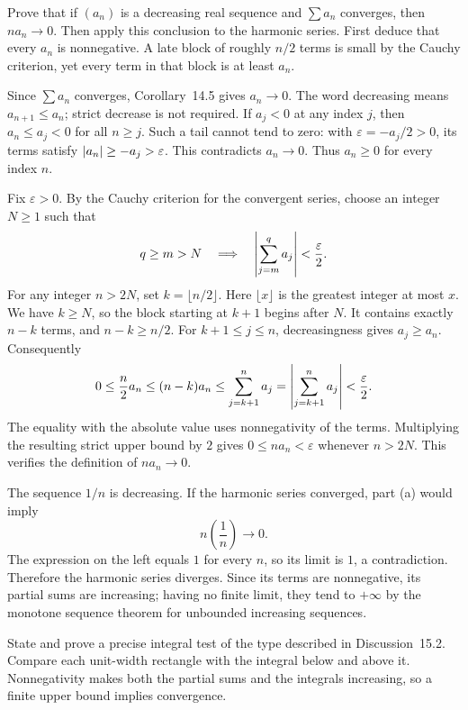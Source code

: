 \goal Prove that if $(a_n)$ is a decreasing real sequence and
$\sum a_n$ converges, then $na_n\to0$. Then apply this conclusion
to the harmonic series.
\idea First deduce that every $a_n$ is nonnegative. A late block
of roughly $n/2$ terms is small by the Cauchy criterion, yet every
term in that block is at least $a_n$.

Since $\sum a_n$ converges, Corollary~14.5 gives $a_n\to0$.
The word decreasing means $a_{n+1}\le a_n$; strict decrease is
not required. If $a_j<0$ at any index $j$, then $a_n\le a_j<0$
for all $n\ge j$. Such a tail cannot tend to zero: with
$\varepsilon=-a_j/2>0$, its terms satisfy
$\left|a_n\right|\ge-a_j>\varepsilon$. This contradicts $a_n\to0$.
Thus $a_n\ge0$ for every index $n$.

Fix $\varepsilon>0$. By the Cauchy criterion for the convergent
series, choose an integer $N\ge1$ such that
\[
 q\ge m>N\quad\Longrightarrow\quad
 \left|\sum_{j=m}^{q}a_j\right|<\frac{\varepsilon}{2}.
\]
For any integer $n>2N$, set $k=\lfloor n/2\rfloor$.
Here $\lfloor x\rfloor$ is the greatest integer at most $x$.
We have $k\ge N$, so the block starting at $k+1$ begins after $N$.
It contains exactly $n-k$ terms, and $n-k\ge n/2$.
For $k+1\le j\le n$, decreasingness gives $a_j\ge a_n$.
Consequently
\[
 0\le\frac n2 a_n
 \le(n-k)a_n
 \le\sum_{j=k+1}^{n}a_j
 =\left|\sum_{j=k+1}^{n}a_j\right|
 <\frac{\varepsilon}{2}.
\]
The equality with the absolute value uses nonnegativity of the
terms. Multiplying the resulting strict upper bound by $2$ gives
$0\le na_n<\varepsilon$ whenever $n>2N$.
This verifies the definition of $na_n\to0$.

The sequence $1/n$ is decreasing. If the harmonic series converged,
part (a) would imply
\[
 n\left(\frac1n\right)\longrightarrow0.
\]
The expression on the left equals $1$ for every $n$, so its limit
is $1$, a contradiction. Therefore the harmonic series diverges.
Since its terms are nonnegative, its partial sums are increasing;
having no finite limit, they tend to $+\infty$ by the monotone
sequence theorem for unbounded increasing sequences.

\goal State and prove a precise integral test of the type described
in Discussion~15.2.
\idea Compare each unit-width rectangle with the integral below
and above it. Nonnegativity makes both the partial sums and the
integrals increasing, so a finite upper bound implies convergence.

